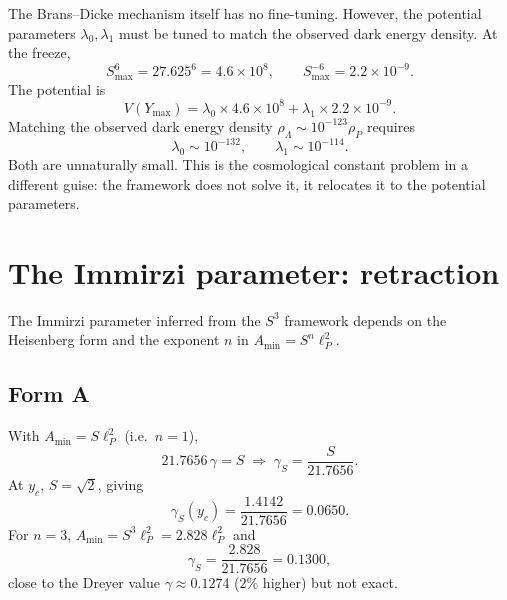 \documentclass[a4paper,1pt,oneside,openany]{book}
\begin{document}
The Brans--Dicke mechanism itself has no fine-tuning. However, 
the potential parameters $\lambda_{0},\lambda_{1}$ must be tuned 
to match the observed dark energy density. At the freeze,
\begin{equation}
S_{\max}^{6}=27.625^{6}=4.6\times10^{8},
\qquad
S_{\max}^{-6}=2.2\times10^{-9}.
\label{eq:S6}
\end{equation}
The potential is
\begin{equation}
V(Y_{\max})
=
\lambda_{0}\times4.6\times10^{8}
+
\lambda_{1}\times2.2\times10^{-9}.
\label{eq:Vfreeze}
\end{equation}
Matching the observed dark energy density 
$\rho_{\Lambda}\sim10^{-123}\rho_{P}$ requires
\begin{equation}
\lambda_{0}\sim10^{-132},
\qquad
\lambda_{1}\sim10^{-114}.
\label{eq:lambda}
\end{equation}
Both are unnaturally small. This is the cosmological constant 
problem in a different guise: the framework does not solve it, 
it relocates it to the potential parameters.

\section{The Immirzi parameter: retraction}

The Immirzi parameter inferred from the $S^{3}$ framework 
depends on the Heisenberg form and the exponent $n$ in 
$A_{\text{min}}=S^{n}\ell_{P}^{2}$.

\subsection{Form A}

With $A_{\text{min}}=S\ell_{P}^{2}$ (i.e.\ $n=1$),
\begin{equation}
21.7656\,\gamma=S
\;\Longrightarrow\;
\gamma_{S}=\frac{S}{21.7656}.
\label{eq:gamma-A}
\end{equation}
At $y_{c}$, $S=\sqrt{2}$, giving
\begin{equation}
\gamma_{S}(y_{c})
=
\frac{1.4142}{21.7656}
=
0.0650.
\label{eq:gamma-A-yc}
\end{equation}
For $n=3$, $A_{\text{min}}=S^{3}\ell_{P}^{2}=2.828\ell_{P}^{2}$ and
\begin{equation}
\gamma_{S}=\frac{2.828}{21.7656}=0.1300,
\label{eq:gamma-n3}
\end{equation}
close to the Dreyer value $\gamma\approx0.1274$ ($2\%$ higher) 
but not exact.
\end{document}
